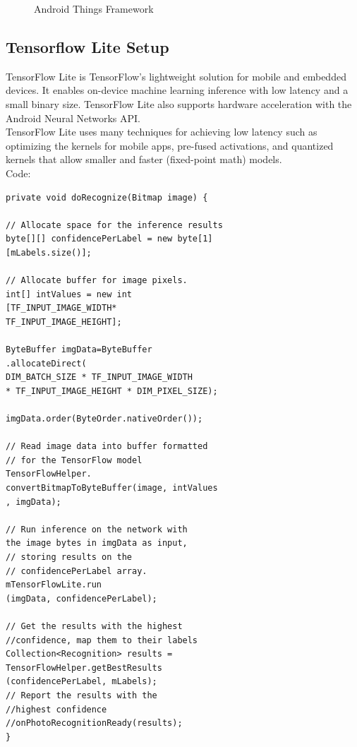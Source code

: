 \documentclass[a4paper,conference]{IEEEtran}
\begin{document}
		\begin{figure}[h] 
			\centering
			\centering
			\caption{Android Things Framework}
			\label{fig:android}
			\end{figure}

	\subsection{Tensorflow Lite Setup} \label{subsection:tensorflow}

	TensorFlow Lite is TensorFlow’s lightweight solution for mobile and embedded devices. It enables on-device machine learning inference with low latency and a small binary size. TensorFlow Lite also supports hardware acceleration with the Android Neural Networks API.\\
			\newline
	TensorFlow Lite uses many techniques for achieving low latency such as optimizing the kernels for mobile apps, pre-fused activations, and quantized kernels that allow smaller and faster (fixed-point math) models.\\
	\newline
	Code:
	\begin{verbatim}
private void doRecognize(Bitmap image) {

// Allocate space for the inference results
byte[][] confidencePerLabel = new byte[1]
[mLabels.size()];

// Allocate buffer for image pixels.
int[] intValues = new int
[TF_INPUT_IMAGE_WIDTH*
TF_INPUT_IMAGE_HEIGHT];

ByteBuffer imgData=ByteBuffer
.allocateDirect(
DIM_BATCH_SIZE * TF_INPUT_IMAGE_WIDTH 
* TF_INPUT_IMAGE_HEIGHT * DIM_PIXEL_SIZE);

imgData.order(ByteOrder.nativeOrder());

// Read image data into buffer formatted
// for the TensorFlow model
TensorFlowHelper.
convertBitmapToByteBuffer(image, intValues
, imgData);

// Run inference on the network with 
the image bytes in imgData as input,
// storing results on the 
// confidencePerLabel array.
mTensorFlowLite.run
(imgData, confidencePerLabel);

// Get the results with the highest 
//confidence, map them to their labels
Collection<Recognition> results = 
TensorFlowHelper.getBestResults
(confidencePerLabel, mLabels);
// Report the results with the 
//highest confidence
//onPhotoRecognitionReady(results);
}

	\end{verbatim}
\end{document}
